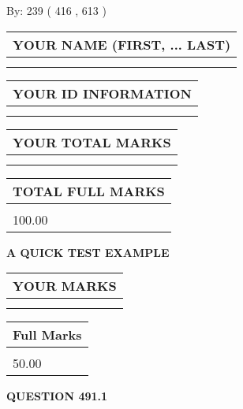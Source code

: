 \documentclass[12pt]{article}
\begin{document}
   
\hspace{1.0in} By: 
 239 ( 416 ,  613 )
   
   
   
   
\newpage 
\setcounter{page}{ 
   491001 } 
   
   
   
   
\noindent\begin{tabular}{|l|}
\hline
YOUR NAME (FIRST, ... LAST)  \\
\hline
 \\ 
 \\ 
\hline
\end{tabular}
\hspace{0.05in} \begin{tabular}{|l|}
\hline
 YOUR   ID   INFORMATION  \\
\hline
 \\ 
 \\ 
\hline
\end{tabular}
   
   
\vspace{0.2in}\noindent\begin{tabular}{|l|}
\hline
YOUR TOTAL MARKS  \\
\hline
 \\ 
 \\ 
\hline
\end{tabular}
\hspace{0.05in} \begin{tabular}{|l|}
\hline
TOTAL FULL MARKS  \\
\hline
 \\ 
100.00 \\
\hline
\end{tabular}
   
   
 \vspace{0.2in}
{\LARGE {\textbf{ A QUICK TEST EXAMPLE}}}
   
   
  
\vspace{0.2in}
  
\noindent\begin{tabular}{|l|}
\hline
 YOUR MARKS  \\
\hline
 \\ 
 \\ 
\hline
\end{tabular}
\hspace{0.05in} \begin{tabular}{|l|}
\hline
 Full Marks  \\
\hline
 \\ 
50.00 \\
\hline
\end{tabular}
{\textbf{\Large{QUESTION
491.1 
}}}
  
\end{document}
